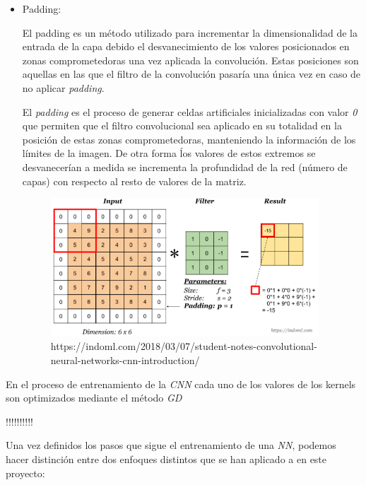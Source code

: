 \begin{itemize}
                \item Padding:

                    El padding es un método utilizado para incrementar la dimensionalidad de la entrada de la capa debido el desvanecimiento de los valores posicionados en zonas comprometedoras una vez aplicada la convolución. Estas posiciones son aquellas en las que el filtro de la convolución pasaría una única vez en caso de no aplicar \textit{padding}.

                    El \textit{padding} es el proceso de generar celdas artificiales inicializadas con valor \textit{0} que permiten que el filtro convolucional sea aplicado en su totalidad en la posición de estas zonas comprometedoras, manteniendo la información de los límites de la imagen. De otra forma ĺos valores de estos extremos se desvanecerían a medida se incrementa la profundidad de la red (número de capas) con respecto al resto de valores de la matriz.

                    \begin{figure}[h]
                        \centering
                        \includegraphics[width=10cm]{archivos/CNN/padding}
                        \caption{https://indoml.com/2018/03/07/student-notes-convolutional-neural-networks-cnn-introduction/}
                        \label{PaddingImage}
                     \end{figure}



                        
            \end{itemize}

            En el proceso de entrenamiento de la \textit{CNN} cada uno de los valores de los kernels son optimizados mediante el método \textit{GD}

            !!!!!\cite{KL-Divergence}!!!!!

            Una vez definidos los pasos que sigue el entrenamiento de una \textit{NN}, podemos hacer distinción entre dos enfoques distintos que se han aplicado a en este proyecto:


